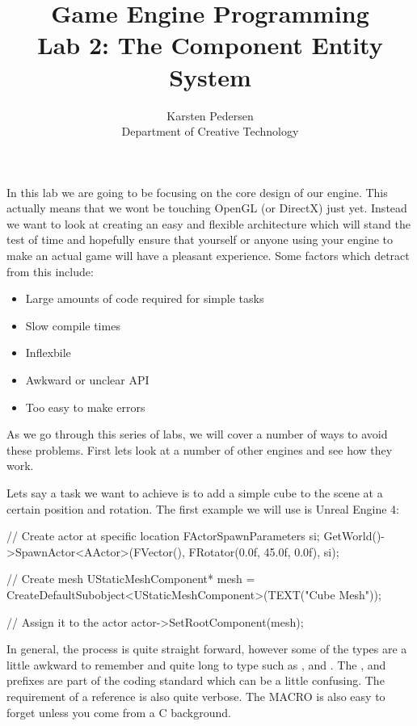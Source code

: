 \documentclass[10pt]{article}
\begin{document}
\title{Game Engine Programming \\
  \large Lab 2: The Component Entity System}

\author{Karsten Pedersen\\ Department of Creative Technology}
\maketitle

In this lab we are going to be focusing on the core design of our
engine. This actually means that we wont be touching OpenGL (or DirectX)
just yet.  Instead we want to look at creating an easy and flexible
architecture which will stand the test of time and hopefully ensure that
yourself or anyone using your engine to make an actual game will have
a pleasant experience. Some factors which detract from this include:

\begin{itemize}
\item Large amounts of code required for simple tasks
\item Slow compile times
\item Inflexbile
\item Awkward or unclear API
\item Too easy to make errors
\end{itemize}

As we go through this series of labs, we will cover a number of ways to
avoid these problems. First lets look at a number of other engines and
see how they work.

Lets say a task we want to achieve is to add a simple cube to the scene
at a certain position and rotation. The first example we will use is
Unreal Engine 4:

\begin{Code}

// Create actor at specific location
FActorSpawnParameters si;
GetWorld()->SpawnActor<AActor>(FVector(), FRotator(0.0f, 45.0f, 0.0f), si);

// Create mesh
UStaticMeshComponent* mesh =
  CreateDefaultSubobject<UStaticMeshComponent>(TEXT("Cube Mesh"));

// Assign it to the actor
actor->SetRootComponent(mesh);

\end{Code}

In general, the process is quite straight forward, however some of
the types are a little awkward to remember and quite long to type
such as ,  and
. The ,  and 
prefixes are part of the coding standard which can be a little
confusing. The requirement of a  reference is
also quite verbose. The  MACRO is also easy to forget unless
you come from a C background.
\end{document}
